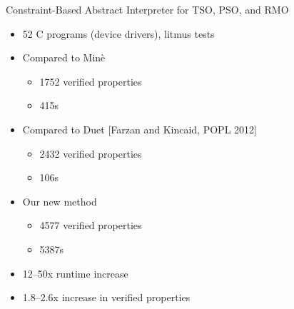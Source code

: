 \documentclass[t]{beamer}
\begin{document}
\begin{frame}{Constraint-Based Abstract Interpreter for TSO, PSO, and RMO}
  \begin{itemize}[<+->]
    \item 52 C programs (device drivers), litmus tests
    \item Compared to Min\`{e}
      \begin{itemize}
        \item 1752 verified properties
        \item 415s
      \end{itemize}
    \item Compared to Duet [Farzan and Kincaid, POPL 2012]
      \begin{itemize}
        \item 2432 verified properties
        \item 106s
      \end{itemize}
    \item Our new method
      \begin{itemize}
        \item 4577 verified properties
        \item 5387s
      \end{itemize}
    \item 12--50x runtime increase
    \item 1.8--2.6x increase in verified properties
  \end{itemize}
\end{frame}
\end{document}
